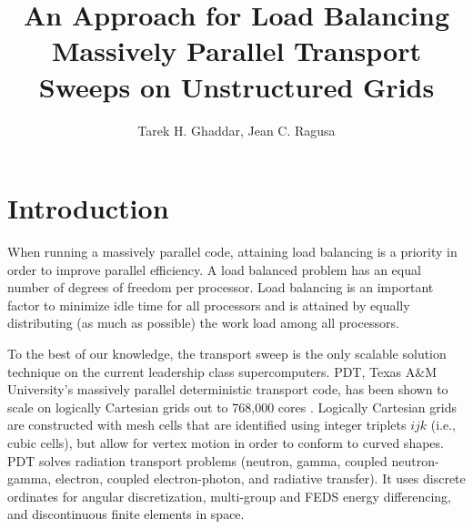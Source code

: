 \documentclass{anstrans}
\title{An Approach for Load Balancing Massively Parallel Transport Sweeps on Unstructured Grids}
\author{Tarek H. Ghaddar, Jean C. Ragusa}
\institute{
Dept. of Nuclear Engineering, Texas A\&M University, College Station, TX, 77843-3133
}
\begin{document}
\vspace*{-42pt}
\begin{strip}
\vspace*{14pt}
\end{strip}


\section{Introduction}
When running a massively parallel code, attaining load balancing is a priority in order to improve parallel efficiency. A load balanced problem has an equal number of degrees of freedom per processor. Load balancing is an important factor to minimize idle time for all processors and is attained by equally distributing (as much as possible) the work load among all processors. 

To the best of our knowledge, the transport sweep is the only scalable solution technique on the current leadership class supercomputers. PDT, Texas A\&M University's massively parallel deterministic transport code, has been shown to scale on logically Cartesian grids out to 768,000 cores \cite{mpadams2015}. Logically Cartesian grids are constructed with mesh cells that are identified using integer triplets $ijk$ (i.e., cubic cells), but allow for vertex motion in order to conform to curved shapes. PDT solves radiation transport problems (neutron, gamma, coupled neutron-gamma, electron, coupled electron-photon, and radiative transfer). It uses discrete ordinates for angular discretization\cite{pwld_ragusa,pwld_teresa}, multi-group and FEDS\cite{feds} energy differencing, and discontinuous finite elements in space.  
\end{document}
